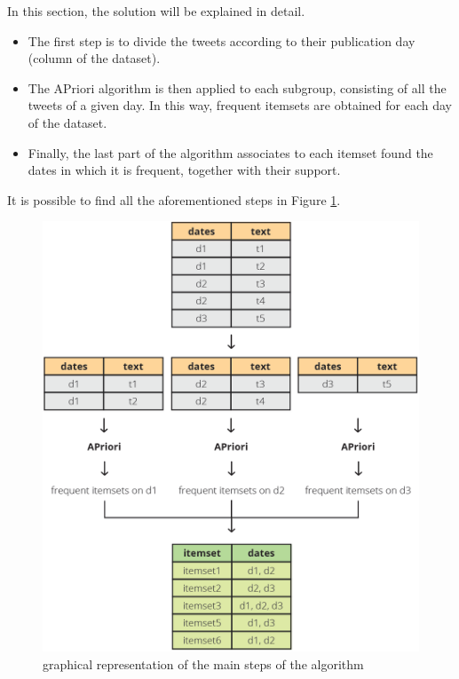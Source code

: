 In this section, the solution will be explained in detail.

\begin{itemize}
  \item The first step is to divide the tweets according to their publication day (column  of the dataset).

  \item The APriori algorithm is then applied to each subgroup, consisting of all the tweets of a given day. In this way, frequent itemsets are obtained for each day of the dataset.
  
  \item Finally, the last part of the algorithm associates to each itemset found the dates in which it is frequent, together with their support.
\end{itemize}

It is possible to find all the aforementioned steps in Figure \ref{figSol}.

\begin{figure}[h]
  \includegraphics[scale=0.292]{solution.png}
  \centering
  \caption{graphical representation of the main steps of the algorithm}
  \label{figSol}
\end{figure} 

